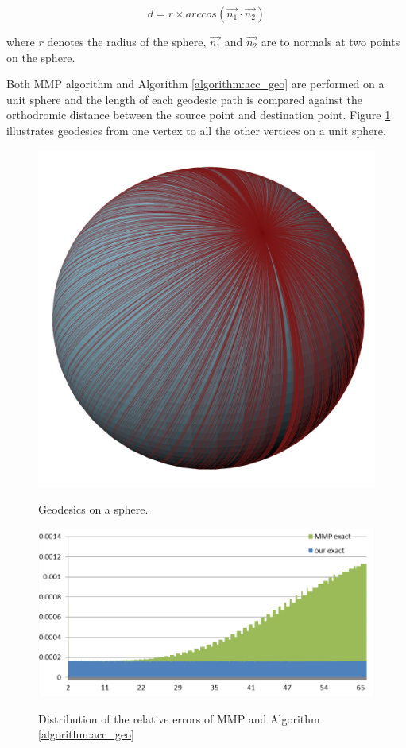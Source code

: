 \begin{equation}
d = r\times  arccos(\vec{n_{1}} \cdot \vec{n_{2}})
\label{equation:arc_length}
\end{equation}

where $r$ denotes the radius of the sphere, $\vec{n_{1}} $ and $\vec{n_{2}}$ are to normals at two points on the sphere.

Both MMP algorithm and Algorithm \ref{algorithm:acc_geo} are performed on a unit sphere and the length of each geodesic path is compared against the orthodromic distance between the source point and destination point. Figure \ref{figure:geodesic_on_sphere} illustrates geodesics from one vertex to all the other vertices on a unit sphere.

\begin{figure}[H]
	\centering
	\includegraphics[width=0.8\columnwidth]{../images/geodesic_image/standard_ball}\\
    \caption{Geodesics on a sphere.}
    \label{figure:geodesic_on_sphere}
\end{figure} 


\begin{figure}[H]
	\centering
	\includegraphics[width=0.8\columnwidth]{../images/geodesic_image/accuracy_2}\\
    \caption{Distribution of the relative errors of MMP and Algorithm \ref{algorithm:acc_geo}}
    \label{figure:acc_geodesic_accuracy_on_sphere}
\end{figure}  

